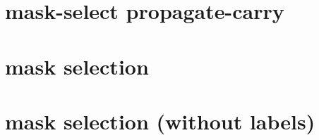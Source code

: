 \documentclass{article}
\begin{document}
\section{mask-select propagate-carry}
%

\newpage
\section{mask selection}


\newpage
\section{mask selection (without labels)}

\end{document}
